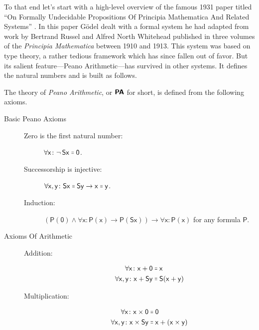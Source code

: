 \documentclass{article}
\theoremstyle{customstyle}
\newcommand{\qu}[1]{\mathsf{#1}}
\newcommand{\eq}{\mathrel{\resizebox{1.15\height}{1.15\height}{=}}}
\newcommand{\PA}{\textbf{\textsf{PA}}}
\begin{document}
To that end let's start with a high-level overview of the famous 1931 paper titled ``On Formally Undecidable Propositions Of Principia Mathematica And Related Systems'' \cite{goedel}. In this paper Gödel dealt with a formal system he had adapted from work by Bertrand Russel and Alfred North Whitehead published in three volumes of the \emph{Principia Mathematica} between 1910 and 1913. This system was based on type theory, a rather tedious framework which has since fallen out of favor. But its salient feature---Peano Arithmetic---has survived in other systems. It defines the natural numbers and is built as follows.

\begin{definition}
  The theory of \emph{Peano Arithmetic}, or $\PA$ for short, is defined from the following axioms.
  \begin{description}
    \item[Basic Peano Axioms]
          \begin{description}
            \item[]
            \item[Zero is the first natural number:]
                  $\qu{\forall x \colon \neg\, S x \eq 0}$.
            \item[Successorship is injective:]
                  $\qu{\forall x, y \colon Sx \eq Sy \rightarrow x \eq y}$.
            \item[Induction:]
                  $\qu{(P(0) \land \forall x \colon P(x) \rightarrow P(Sx)) \rightarrow \forall x \colon P(x)}$ for any formula $\qu{P}$.
          \end{description}
    \item[Axioms Of Arithmetic]
          \begin{description}
            \item[]
            \item[Addition:]
                  \begin{align*}
                    \qu{\forall x \colon x + 0}     & \eq\qu{x}        \\
                    \qu{\forall x, y \colon x + Sy} & \eq\qu{S(x + y)}
                  \end{align*}
            \item[Multiplication:]
                  \begin{align*}
                    \qu{\forall x \colon x \times 0}     & \eq\qu{0}                \\
                    \qu{\forall x, y \colon x \times Sy} & \eq\qu{x + (x \times y)}
                  \end{align*}
          \end{description}
  \end{description}
\end{definition}
\end{document}
